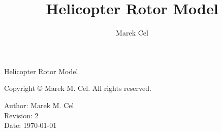\documentclass[12pt,a4paper]{report}
\title{Helicopter Rotor Model}
\author{Marek Cel}
\date{}
\begin{document}
  
  \begin{titlepage}
    \centering
    {\huge Helicopter Rotor Model\par}
  \end{titlepage}
  

  \noindent Copyright \copyright{} \the\year{} Marek M. Cel. All rights reserved.

  \noindent Author: Marek M. Cel \\
  Revision: 2 \\
  Date: \today

  
  
  {
    \clearpage
    \setlength{\parskip}{0em}
    \tableofcontents
  }\

  
  
  
  
  
  \clearpage
   
  
  
\end{document}
